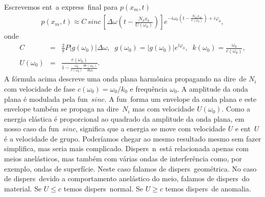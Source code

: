 Escrevemos ent\ao\ a express\ao\ final para $p(x_m,t)$
\begin{eqnarray}
p(x_m,t) \approx C\,sinc\,\left[\Delta\omega\left(t - \frac{N_k x_k}{U(\omega_0)} \right) \right]
e^{-i\omega_0(t - \frac{N_m x_m}{c(\omega_0)}) + i\varphi_0},
\end{eqnarray}
onde
\begin{eqnarray}
C &=& \frac{2}{\pi}P|g(\omega_0)|\Delta\omega, \;\; g(\omega_0) = |g(\omega_0)|e^{i\varphi_0}, \;\; k(\omega_0) = 
\frac{\omega_0}{c(\omega_0)}, \\
U(\omega_0) &=& \frac{c(\omega_0)}{1 - \frac{\omega_0}{c(\omega_0)}\frac{dc(\omega_0)}{d\omega_0}}.
\end{eqnarray}
A f\'ormula acima descreve uma onda plana harm\^onica propagando na
dire\cao\ de $N_i$ com velocidade de fase $c(\omega_0) = \omega_0/k_0$ e
frequ\^encia $\omega_0$. A amplitude da onda plana \'e modulada pela
fun\cao\ $sinc$. A fun\cao\ forma um envelope da onda plana e este
envelope tamb\'em se propaga na dire\cao\ $N_i$ mas com velocidade
$U(\omega_0)$. Como a energia el\'astica \'e proporcional ao quadrado da
amplitude da onda plana, em nosso caso da fun\cao\ $sinc$, significa que
a energia se move com velocidade $U$ e ent\ao\ $U$ \'e a velocidade de
grupo. Poder\'iamos chegar ao mesmo resultado mesmo sem fazer
simplifica\coes, mas seria mais complicado. Dispers\ao\ n\ao\ est\'a
relacionada apenas com meios anel\'asticos, mas tamb\'em com v\'arias
ondas de interfer\^encia como, por exemplo, ondas de superf\'icie. Neste
caso falamos de dispers\ao\ geom\'etrica. No caso de dispers\ao\ devido
a comportamento anel\'astico do meio, falamos de dispers\ao\ do
material. Se $U \leq c$ temos dispers\ao\ normal. Se $U \geq c$ temos
dispers\ao\ de anomalia.


